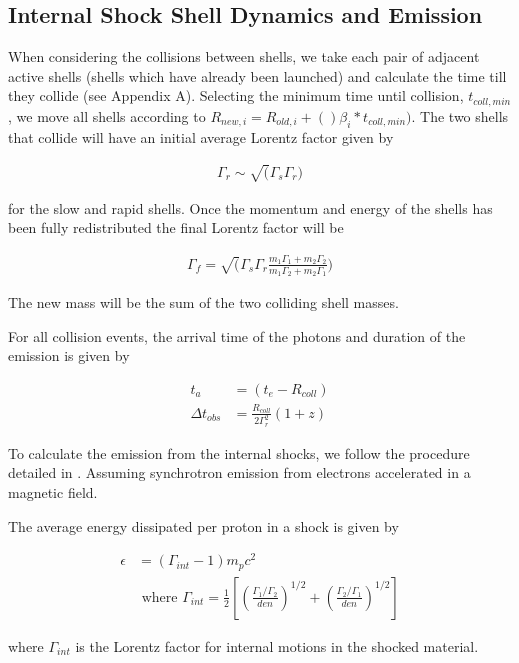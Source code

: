 \documentclass[linenumbers]{aastex631}
\begin{document}
\subsection{Internal Shock Shell Dynamics and Emission}

When considering the collisions between shells, we take each pair of adjacent active shells (shells which have already been launched) and calculate the time till they collide (see Appendix A). Selecting the minimum time until collision, $t_{coll,min}$, we move all shells according to $R_{new,i} = R_{old,i} + ()\beta_i * t_{coll,min})$. The two shells that collide will have an initial average Lorentz factor given by

\begin{align}
	\Gamma_r \sim \sqrt(\Gamma_s \Gamma_r)
\end{align}

for the slow and rapid shells. Once the momentum and energy of the shells has been fully redistributed the final Lorentz factor will be 

\begin{align}
	\Gamma_f = \sqrt(\Gamma_s \Gamma_r \frac{m_1 \Gamma_1 + m_2 \Gamma_2}{m_1\Gamma_2 + m_2\Gamma_1})
\end{align}

The new mass will be the sum of the two colliding shell masses. 

For all collision events, the arrival time of the photons and duration of the emission is given by

\begin{align}
	t_a &= (t_e - R_{coll})\\
	\Delta t_{obs} &= \frac{R_{coll}}{2\Gamma_r^2} (1+z)
\end{align}

To calculate the emission from the internal shocks, we follow the procedure detailed in \citet{1998MNRAS.296..275D}. Assuming synchrotron emission from electrons accelerated in a magnetic field. 

The average energy dissipated per proton in a shock is given by

\begin{align}
	\epsilon &= (\Gamma_{int} - 1) m_p c^2 \\
	& \text{ where } \Gamma_{int} = \frac{1}{2}\left[\left(\frac{\Gamma_1/\Gamma_2}{den}\right)^{1/2} + \left(\frac{\Gamma_2/\Gamma_1}{den}\right)^{1/2}\right]
\end{align}

where $\Gamma_{int}$ is the Lorentz factor for internal motions in the shocked material.
\end{document}
